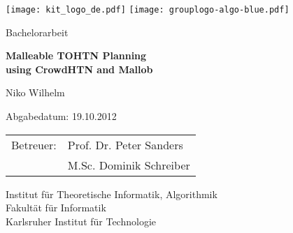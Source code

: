 \documentclass[enabledeprecatedfontcommands,12pt,a4paper,twoside]{scrartcl}
\numberwithin{equation}{section}
\begin{document}

\pagestyle{empty} %

\begin{titlepage}

  \begin{center}\large

    \quad\texttt{[image: kit\_logo\_de.pdf]} \hfill
    \texttt{[image: grouplogo-algo-blue.pdf]}\quad\null

    \vfill

    Bachelorarbeit
    \vspace*{2cm}

    {\bf\huge Malleable TOHTN Planning \\using CrowdHTN and Mallob \par}

    \vfill

    Niko Wilhelm

    \vspace*{15mm}

    Abgabedatum: 19.10.2012

    \vspace*{45mm}

    \begin{tabular}{rl}
      Betreuer: & Prof. Dr. Peter Sanders \\
      & M.Sc. Dominik Schreiber \\
    \end{tabular}
    
    \vspace*{10mm}

    Institut für Theoretische Informatik, Algorithmik \\
    Fakultät für Informatik \\
    Karlsruher Institut für Technologie


    \vspace*{12mm}
  \end{center}

\end{titlepage}
\end{document}
